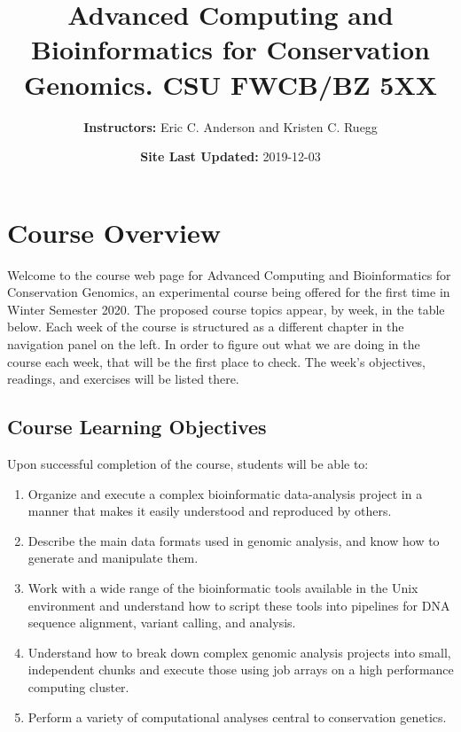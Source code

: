 \documentclass[]{book}
\title{Advanced Computing and Bioinformatics for Conservation Genomics. CSU FWCB/BZ 5XX}
\author{\textbf{Instructors:} Eric C. Anderson and Kristen C. Ruegg}
\date{\textbf{Site Last Updated:} 2019-12-03}
\providecommand{\tightlist}{%
  \setlength{\itemsep}{0pt}\setlength{\parskip}{0pt}}
\begin{document}
\maketitle

{
\setcounter{tocdepth}{1}
\tableofcontents
}
\hypertarget{course-overview}{%
\chapter*{Course Overview}\label{course-overview}}

Welcome to the course web page for Advanced Computing and Bioinformatics for Conservation Genomics,
an experimental course being offered for the first time in Winter Semester 2020. The proposed course
topics appear, by week, in the table below. Each week of the course is structured as a different
chapter in the navigation panel on the left. In order to figure out what we are doing in the course
each week, that will be the first place to check. The week's objectives, readings, and exercises will
be listed there.

\hypertarget{course-learning-objectives}{%
\section*{Course Learning Objectives}\label{course-learning-objectives}}

Upon successful completion of the course, students will be able to:

\begin{enumerate}
\def\labelenumi{\arabic{enumi}.}
\tightlist
\item
  Organize and execute a complex bioinformatic data-analysis project in a manner that makes it easily understood and reproduced by others.
\item
  Describe the main data formats used in genomic analysis, and know how to generate and manipulate them.
\item
  Work with a wide range of the bioinformatic tools available in the Unix environment and understand how to script these tools into pipelines for DNA sequence alignment, variant calling, and analysis.
\item
  Understand how to break down complex genomic analysis projects into small, independent chunks and execute those using job arrays on a high performance computing cluster.
\item
  Perform a variety of computational analyses central to conservation genetics.
\end{enumerate}
\end{document}
